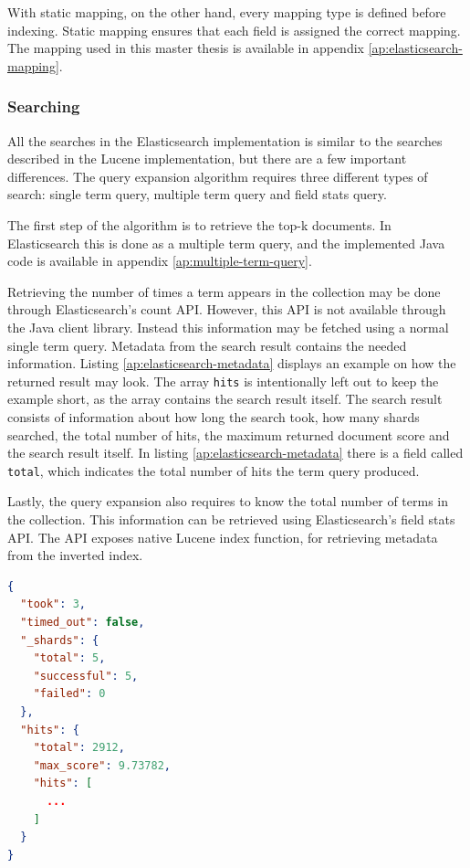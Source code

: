 With static mapping, on the other hand, every mapping type is defined before indexing.
Static mapping ensures that each field is assigned the correct mapping.
The mapping used in this master thesis is available in appendix \ref{ap:elasticsearch-mapping}.

\subsubsection{Searching}
All the searches in the Elasticsearch implementation is similar to the searches described in the Lucene implementation,
but there are a few important differences.
The query expansion algorithm requires three different types of search:
single term query, multiple term query and field stats query.

The first step of the algorithm is to retrieve the top-k documents.
In Elasticsearch this is done as a multiple term query,
and the implemented Java code is available in appendix \ref{ap:multiple-term-query}.

Retrieving the number of times a term appears in the collection may be done through Elasticsearch's count API.
However, this API is not available through the Java client library.
Instead this information may be fetched using a normal single term query.
Metadata from the search result contains the needed information.
Listing \ref{ap:elasticsearch-metadata} displays an example on how the returned result may look.
The array \texttt{hits} is intentionally left out to keep the example short,
as the array contains the search result itself.
The search result consists of information about how long the search took, how many shards searched, the total number of hits,
the maximum returned document score and the search result itself.
In listing \ref{ap:elasticsearch-metadata} there is a field called \texttt{total},
which indicates the total number of hits the term query produced.

Lastly, the query expansion also requires to know the total number of terms in the collection.
This information can be retrieved using Elasticsearch's field stats API.
The API exposes native Lucene index function,
for retrieving metadata from the inverted index.

\begin{lstlisting}[language={json}, caption={Example of the metadata returned by Elasticsearch.}, label={ap:elasticsearch-metadata}]
{
  "took": 3,
  "timed_out": false,
  "_shards": {
    "total": 5,
    "successful": 5,
    "failed": 0
  },
  "hits": {
    "total": 2912,
    "max_score": 9.73782,
    "hits": [
      ...
    ]
  }
}
\end{lstlisting}

